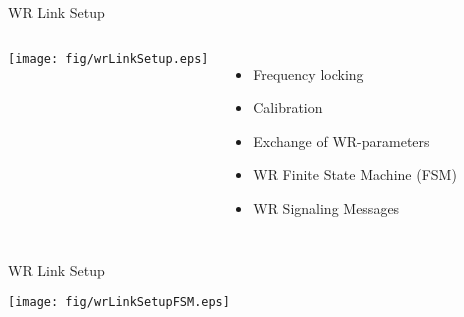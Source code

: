 \documentclass[compress,red]{beamer}
\begin{document}
\begin{frame}{WR Link Setup }

  \begin{columns}[c]

      \begin{center}
      \texttt{[image: fig/wrLinkSetup.eps]}
      \end{center}



      \begin{itemize}
	\item Frequency locking
	\item Calibration
	\item Exchange of WR-parameters
	\item WR Finite State Machine (FSM)
	\item WR Signaling Messages
      \end{itemize}

  \end{columns}

\end{frame}
\begin{frame}{WR Link Setup}

      \begin{center}
      \texttt{[image: fig/wrLinkSetupFSM.eps]}
      \end{center}

\end{frame}
\end{document}
